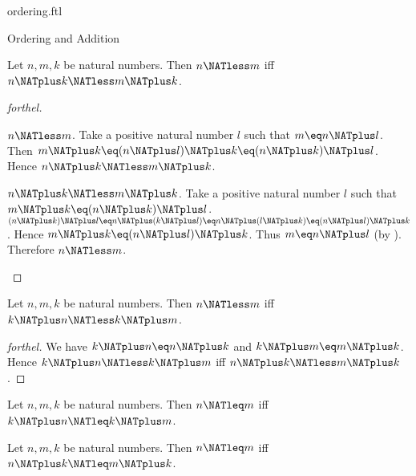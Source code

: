 \documentclass{naproche-library}
\begin{document}
\begin{smodule}[title=The Standard Ordering of the Natural Numbers]{ordering.ftl}
\begin{sfragment}{Ordering and Addition}
  \begin{proposition}[forthel,id=ARITHMETIC_04_7354062662008832]
    Let $n, m, k$ be natural numbers.
    Then $n \NATless m$ iff $n \NATplus k \NATless m \NATplus k$.
  \end{proposition}
  \begin{proof}[forthel]
    \begin{case}{$n \NATless m$.}
      Take a positive natural number $l$ such that $m \eq n \NATplus l$.
      Then $m \NATplus k
        \eq (n \NATplus l) \NATplus k
        \eq (n \NATplus k) \NATplus l$.
      Hence $n \NATplus k \NATless m \NATplus k$.
    \end{case}

    \begin{case}{$n \NATplus k \NATless m \NATplus k$.}
      Take a positive natural number $l$ such that $m \NATplus k \eq (n \NATplus k) \NATplus l$.
      $(n \NATplus k) \NATplus l
        \eq n \NATplus (k \NATplus l)
        \eq n \NATplus (l \NATplus k)
        \eq (n \NATplus l) \NATplus k$.
      Hence $m \NATplus k \eq (n \NATplus l) \NATplus k$.
      Thus $m \eq n \NATplus l$ (by ).
      Therefore $n \NATless m$.
    \end{case}
  \end{proof}

  \begin{corollary}[forthel,id=ARITHMETIC_04_1901366129721344]
    Let $n, m, k$ be natural numbers.
    Then $n \NATless m$ iff $k \NATplus n \NATless k \NATplus m$.
  \end{corollary}
  \begin{proof}[forthel]
    We have $k \NATplus n \eq n \NATplus k$ and $k \NATplus m \eq m \NATplus k$.
    Hence $k \NATplus n \NATless k \NATplus m$ iff $n \NATplus k \NATless m \NATplus k$.
  \end{proof}

  \begin{corollary}[forthel,id=ARITHMETIC_04_4203390999461888]
    Let $n, m, k$ be natural numbers.
    Then $n \NATleq m$ iff $k \NATplus n \NATleq k \NATplus m$.
  \end{corollary}

  \begin{corollary}[forthel,id=ARITHMETIC_04_5512590832697344]
    Let $n, m, k$ be natural numbers.
    Then $n \NATleq m$ iff $n \NATplus k \NATleq m \NATplus k$.
  \end{corollary}
\end{sfragment}


\end{smodule}
\end{document}

